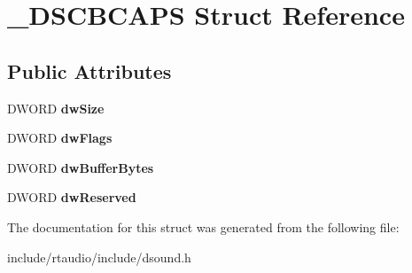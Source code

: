 \hypertarget{struct___d_s_c_b_c_a_p_s}{}\section{\+\_\+\+D\+S\+C\+B\+C\+A\+PS Struct Reference}
\label{struct___d_s_c_b_c_a_p_s}
\subsection*{Public Attributes}
\begin{DoxyCompactItemize}
\item 
D\+W\+O\+RD {\bfseries dw\+Size}\hypertarget{struct___d_s_c_b_c_a_p_s_a98ed4f69d2b011158b8a8d51d7268f35}{}\label{struct___d_s_c_b_c_a_p_s_a98ed4f69d2b011158b8a8d51d7268f35}

\item 
D\+W\+O\+RD {\bfseries dw\+Flags}\hypertarget{struct___d_s_c_b_c_a_p_s_a0c39e1e2a6515ad4ee780f5a6f6729ff}{}\label{struct___d_s_c_b_c_a_p_s_a0c39e1e2a6515ad4ee780f5a6f6729ff}

\item 
D\+W\+O\+RD {\bfseries dw\+Buffer\+Bytes}\hypertarget{struct___d_s_c_b_c_a_p_s_a24423e75907ea752708c691e3cf486b8}{}\label{struct___d_s_c_b_c_a_p_s_a24423e75907ea752708c691e3cf486b8}

\item 
D\+W\+O\+RD {\bfseries dw\+Reserved}\hypertarget{struct___d_s_c_b_c_a_p_s_a8cab047dbf978f61365ca86c93317c00}{}\label{struct___d_s_c_b_c_a_p_s_a8cab047dbf978f61365ca86c93317c00}

\end{DoxyCompactItemize}


The documentation for this struct was generated from the following file\+:\begin{DoxyCompactItemize}
\item 
include/rtaudio/include/dsound.\+h\end{DoxyCompactItemize}
